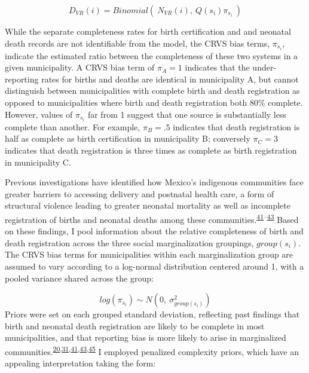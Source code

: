 \documentclass[
]{article}
\begin{document}
\[D_{VR}(i) = Binomial(~N_{VR}(i),~Q(s_i)\pi_{s_i}~)\]

While the separate completeness rates for birth certification and and neonatal death records are not identifiable from the model, the CRVS bias terms, \(\pi_{s_i}\), indicate the estimated ratio between the completeness of these two systems in a given municipality. A CRVS bias term of \(\pi_{A}=1\) indicates that the under-reporting rates for births and deaths are identical in municipality A, but cannot distinguish between municipalities with complete birth and death registration as opposed to municipalities where birth and death registration both 80\% complete. However, values of \(\pi_{s_i}\) far from 1 suggest that one source is substantially less complete than another. For example, \(\pi_B=.5\) indicates that death registration is half as complete as birth certification in municipality B; conversely \(\pi_C=3\) indicates that death registration is three times as complete as birth registration in municipality C.

Previous investigations have identified how Mexico's indigenous communities face greater barriers to accessing delivery and postnatal health care, a form of structural violence leading to greater neonatal mortality as well as incomplete registration of births and neonatal deaths among these communities.\textsuperscript{\protect\hyperlink{ref-Enciso2017}{41}--\protect\hyperlink{ref-Gamlin2020}{43}} Based on these findings, I pool information about the relative completeness of birth and death registration across the three social marginalization groupings, \(group(s_i)\). The CRVS bias terms for municipalities within each marginalization group are assumed to vary according to a log-normal distribution centered around 1, with a pooled variance shared across the group:

\[log(\pi_{s_i}) \sim N(0,~\sigma^2_{group(s_i)})\]
Priors were set on each grouped standard deviation, reflecting past findings that birth and neonatal death registration are likely to be complete in most municipalities, and that reporting bias is more likely to arise in marginalized communities.\textsuperscript{\protect\hyperlink{ref-Dicker2018}{20},\protect\hyperlink{ref-Hernandez2012}{31},\protect\hyperlink{ref-Enciso2017}{41},\protect\hyperlink{ref-Gamlin2020}{43},\protect\hyperlink{ref-Luis2014}{45}} I employed penalized complexity priors, which have an appealing interpretation taking the form:
\end{document}
